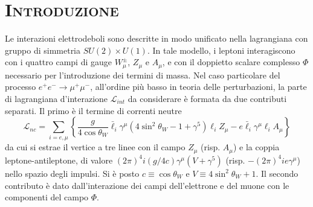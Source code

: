 \documentclass[11pt]{article}
\begin{document}
    \section{\centering\textsc{Introduzione} } %
    Le interazioni elettrodeboli sono descritte in modo unificato nella lagrangiana con gruppo di simmetria $SU(2)\times U(1)$. In tale modello, i leptoni interagiscono con i quattro campi di gauge 
    $W^\pm_\mu$, $Z_\mu$ e $A_\mu$, e con il doppietto scalare complesso $\Phi$ necessario per l'introduzione dei termini di massa. Nel caso particolare del processo $e^+e^-\to\mu^+\mu^-$, all'ordine più basso in teoria delle perturbazioni, 
    la parte di lagrangiana d'interazione $\mathcal{L}_{int}$ da considerare è formata da due contributi separati. Il primo è il termine di correnti neutre
    \begin{equation}
    \mathcal{L}_{nc}=\sum_{i=e,\mu}\left\{\frac{g}{4\cos\theta_W}\bar{\ell}_i\gamma^\mu(4\sin^2\theta_W-1+\gamma^5)\ell_iZ_\mu-e\bar{\ell}_i\gamma^\mu\ell_iA_\mu\right\}
    \end{equation}
    da cui si estrae il vertice a tre linee con il campo $Z_\mu$ (risp. $A_\mu$) e la coppia leptone-antileptone, di valore $(2\pi)^4i(g/4c)\gamma^\mu(V+\gamma^5)$ (risp. $-(2\pi)^4ie\gamma^\mu$) nello spazio degli impulsi. Si è posto $c\equiv\cos\theta_W$ e $V\equiv4\sin^2\theta_W+1$.
    Il secondo contributo è dato dall'interazione dei campi dell'elettrone e del muone con le componenti del campo $\Phi$.

\end{document}

